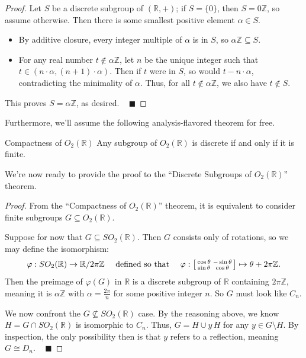 \begin{proof}
    Let $S$ be a discrete subgroup of $(\mathbb{R}, +)$; if $S = \{0\}$, then $S = 0 \mathbb{Z}$, so assume otherwise.  Then there is some smallest positive element $\alpha \in S$.
    \begin{itemize}
        \item By additive closure, every integer multiple of $\alpha$ is in $S$, so $\alpha \mathbb{Z} \subseteq S$.
        \item For any real number $t \not \in \alpha \mathbb{Z}$, let $n$ be the unique integer such that $t \in (n \cdot \alpha, (n + 1) \cdot \alpha)$.  Then if $t$ were in $S$, so would $t - n \cdot \alpha$, contradicting the minimality of $\alpha$.  Thus, for all $t \not \in \alpha \mathbb{Z}$, we also have $t \not \in S$.
    \end{itemize}
    This proves $S = \alpha \mathbb{Z}$, as desired. ~ $\blacksquare$
\end{proof}

Furthermore, we'll assume the following analysis-flavored theorem for free.

\begin{theorem}{Compactness of $O_2(\mathbb{R})$}
    Any subgroup of $O_2(\mathbb{R})$ is discrete if and only if it is finite.
\end{theorem}

We're now ready to provide the proof to the ``Discrete Subgroups of $O_2(\mathbb{R})$'' theorem.

\begin{proof}
    From the ``Compactness of $O_2(\mathbb{R})$'' theorem, it is equivalent to consider finite subgroups $G \subseteq O_2(\mathbb{R})$.

    Suppose for now that $G \subseteq SO_2(\mathbb{R})$.  Then $G$ consists only of rotations, so we may define the isomorphism:
    \[ \varphi: SO_2(\mathbb{R}) \to \mathbb{R}/2\pi \mathbb{Z} ~~~ \text{ defined so that } ~~~ \varphi: \begin{bsmallmatrix} \cos \theta & - \sin \theta \\ \sin \theta & \cos \theta \end{bsmallmatrix} \mapsto \theta + 2 \pi \mathbb{Z}. \]
    Then the preimage of $\varphi(G)$ in $\mathbb{R}$ is a discrete subgroup of $\mathbb{R}$ containing $2 \pi \mathbb{Z}$, meaning it is $\alpha \mathbb{Z}$ with $\alpha = \frac{2\pi}{n}$ for some positive integer $n$.  So $G$ must look like $C_n$.

    We now confront the $G \not \subseteq SO_2(\mathbb{R})$ case.  By the reasoning above, we know $H = G \cap SO_2(\mathbb{R})$ is isomorphic to $C_n$.  Thus, $G = H \cup y \, H$ for any $y \in G \setminus H$.  By inspection, the only possibility then is that $y$ refers to a reflection, meaning $G \cong D_n$. ~ $\blacksquare$
\end{proof}


